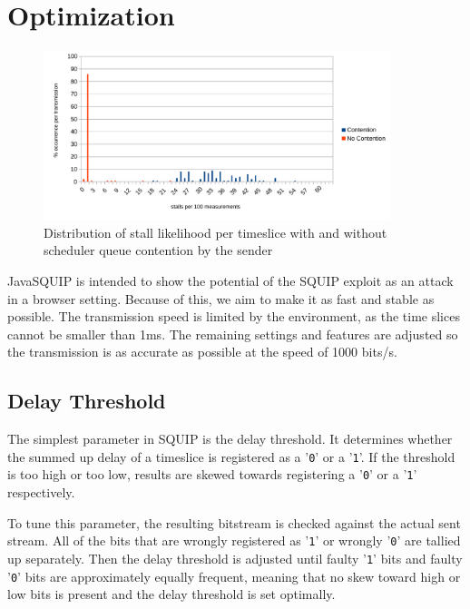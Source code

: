 \documentclass[11pt,
  titlepage=false,
  parskip=half,      %
]{scrreprt}
\begin{document}
\chapter{Optimization}
\label{ch:optimization}
\begin{figure}
\centering
\includegraphics[width=0.9\textwidth]{figures/contentionhistogram}

\caption{Distribution of stall likelihood per timeslice with and without scheduler queue contention by the sender}
\label{fig:contentionhistogram}
\end{figure}

JavaSQUIP is intended to show the potential of the SQUIP exploit as an attack in a browser setting.
Because of this, we aim to make it as fast and stable as possible.
The transmission speed is limited by the environment, as the time slices cannot be smaller than 1ms.
The remaining settings and features are adjusted so the transmission is as accurate as possible at the speed of 1000 bits/s.


\section{Delay Threshold}
\label{sec:delaythreshold}

The simplest parameter in SQUIP is the delay threshold.
It determines whether the summed up delay of a timeslice is registered as a '\texttt{0}' or a '\texttt{1}'.
If the threshold is too high or too low, results are skewed towards registering a '\texttt{0}' or a '\texttt{1}' respectively.

To tune this parameter, the resulting bitstream is checked against the actual sent stream.
All of the bits that are wrongly registered as '\texttt{1}' or wrongly '\texttt{0}' are tallied up separately.
Then the delay threshold is adjusted until faulty '\texttt{1}' bits and faulty '\texttt{0}' bits are approximately equally frequent,
meaning that no skew toward high or low bits is present and the delay threshold is set optimally.
\end{document}
